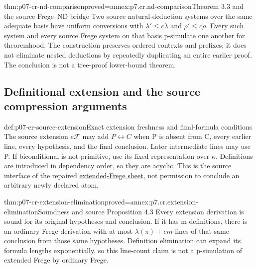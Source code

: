\begin{hbtheorem}{thm:p07-cr-nd-comparison}{proved=annex:p7.cr.nd-comparison}{Theorem 3.3 and the source Frege--ND bridge}
Two source natural-deduction systems over the same adequate basis
have uniform conversions with \(\lambda'\leq c\lambda\) and
\(\rho'\leq c\rho\). Every such system and every source
Frege system on that basis p-simulate one another for theoremhood.
The construction preserves ordered contexts and prefixes; it does
not eliminate nested deductions by repeatedly duplicating an entire
earlier proof. The conclusion is not a tree-proof lower-bound theorem.
\end{hbtheorem}

\subsection{Definitional extension and the source compression arguments}

\begin{hbdefinition}{def:p07-cr-source-extension}{Exact extension freshness and final-formula conditions}
The source extension \(e\mathcal F\) may add
\(P\leftrightarrow C\) when P is absent from C, every earlier
line, every hypothesis, and the final conclusion. Later intermediate
lines may use P. If biconditional is not primitive, use its fixed
representation over \(\kappa\). Definitions are introduced in
dependency order, so they are acyclic. This is the source interface
of the repaired \hyperref[sheet:extended-frege-cpl]{extended-Frege sheet},
not permission to conclude an arbitrary newly declared atom.
\end{hbdefinition}

\begin{hbtheorem}{thm:p07-cr-extension-elimination}{proved=annex:p7.cr.extension-elimination}{Soundness and source Proposition 4.3}
Every extension derivation is sound for its original hypotheses and
conclusion. If it has m definitions, there is an ordinary Frege
derivation with at most \(\lambda(\pi)+cm\) lines of that same
conclusion from those same hypotheses. Definition elimination can
expand its formula lengths exponentially, so this line-count claim
is not a p-simulation of extended Frege by ordinary Frege.
\end{hbtheorem}

